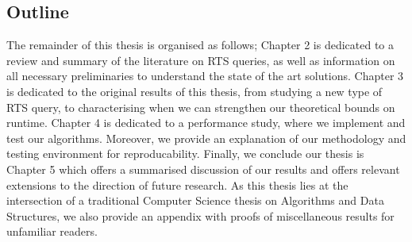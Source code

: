 \subsection{Outline}

The remainder of this thesis is organised as follows; Chapter 2 is dedicated to a review and summary of the literature on RTS queries, as well as information on all necessary preliminaries to understand the state of the art solutions. Chapter 3 is dedicated to the original results of this thesis, from studying a new type of RTS query, to characterising when we can strengthen our theoretical bounds on runtime. Chapter 4 is dedicated to a performance study, where we implement and test our algorithms. Moreover, we provide an explanation of our methodology and testing environment for reproducability. Finally, we conclude our thesis is Chapter 5 which offers a summarised discussion of our results and offers relevant extensions to the direction of future research. As this thesis lies at the intersection of a traditional Computer Science thesis on Algorithms and Data Structures, we also provide an appendix with proofs of miscellaneous results for unfamiliar readers. 

